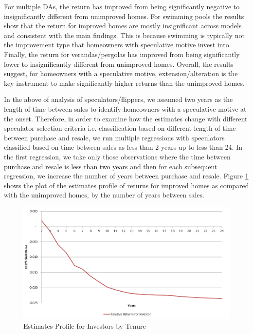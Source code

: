 \documentclass[AEJ,reqno, draftmode]{AEA} %
\begin{document}
For multiple DAs, the return has improved from being significantly negative to insignificantly different from unimproved homes. For swimming pools the results show that the return for improved homes are mostly insignificant across models and consistent with the main findings. This is because swimming is typically not the improvement type that homeowners with speculative motive invest into. Finally, the return for verandas/pergolas has improved from being significantly lower to insignificantly different from unimproved homes. Overall, the results suggest, for homeowners with a speculative motive, extension/alteration is the key instrument to make significantly higher returns than the unimproved homes.

In the above of analysis of speculators/flippers, we assumed two years as the length of time between sales to identify homeowners with a speculative motive at the onset. Therefore, in order to examine how the estimates change with different speculator selection criteria i.e. classification based on different length of time between purchase and resale, we run multiple regressions with speculators classified based on time between sales as less than 2 years up to less than 24. In the first regression, we take only those observations where the time between purchase and resale is less than two years and then for each subsequent regression, we increase the number of years between purchase and resale. Figure \ref{fig:relative_returns_by_investor} shows the plot of the estimates profile of returns for improved homes as compared with the unimproved homes, by the number of years between sales.

\begin{figure}[!ht]
    \centering
     \includegraphics[width=0.9\columnwidth]{Figures/relative_returns_by_investor.png} \par
 \caption{Estimates Profile for Investors by Tenure}
 \vspace{-20pt}
 \label{fig:relative_returns_by_investor}
\end{figure} 
\end{document}

